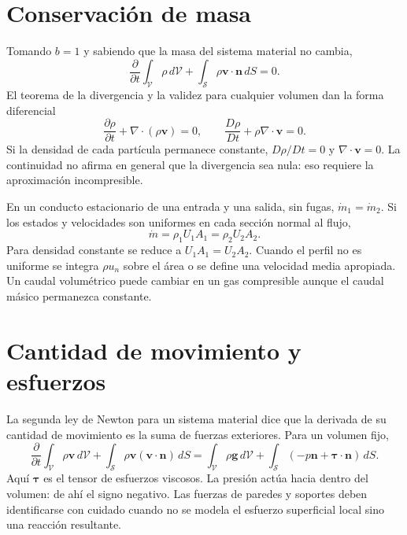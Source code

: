 \section{Conservación de masa}
Tomando $b=1$ y sabiendo que la masa del sistema material no cambia,
\begin{equation}\label{eq:07-masa-int}
 \frac{\partial}{\partial t}\int_{\mathcal V}\rho\,d\mathcal V+
 \int_{\mathcal S}\rho\boldsymbol{v}\cdot\boldsymbol{n}\,dS=0.
\end{equation}
El teorema de la divergencia y la validez para cualquier volumen dan la forma diferencial
\begin{equation}\label{eq:07-masa-dif}
 \frac{\partial\rho}{\partial t}+\nabla\cdot(\rho\boldsymbol{v})=0,
 \qquad \frac{D\rho}{Dt}+\rho\nabla\cdot\boldsymbol{v}=0.
\end{equation}
Si la densidad de cada partícula permanece constante, $D\rho/Dt=0$ y $\nabla\cdot\boldsymbol{v}=0$. La continuidad no afirma en general que la divergencia sea nula: eso requiere la aproximación incompresible.

En un conducto estacionario de una entrada y una salida, sin fugas, $\dot m_1=\dot m_2$. Si los estados y velocidades son uniformes en cada sección normal al flujo,
\begin{equation}
 \dot m=\rho_1U_1A_1=\rho_2U_2A_2.
\end{equation}
Para densidad constante se reduce a $U_1A_1=U_2A_2$. Cuando el perfil no es uniforme se integra $\rho u_n$ sobre el área o se define una velocidad media apropiada. Un caudal volumétrico puede cambiar en un gas compresible aunque el caudal másico permanezca constante.

\section{Cantidad de movimiento y esfuerzos}
La segunda ley de Newton para un sistema material dice que la derivada de su cantidad de movimiento es la suma de fuerzas exteriores. Para un volumen fijo,
\begin{equation}\label{eq:07-momento-int}
 \frac{\partial}{\partial t}\int_{\mathcal V}\rho\boldsymbol{v}\,d\mathcal V+
 \int_{\mathcal S}\rho\boldsymbol{v}(\boldsymbol{v}\cdot\boldsymbol{n})\,dS
 =\int_{\mathcal V}\rho\boldsymbol{g}\,d\mathcal V+
 \int_{\mathcal S}(-p\boldsymbol{n}+\boldsymbol{\tau}\cdot\boldsymbol{n})\,dS.
\end{equation}
Aquí $\boldsymbol{\tau}$ es el tensor de esfuerzos viscosos. La presión actúa hacia dentro del volumen: de ahí el signo negativo. Las fuerzas de paredes y soportes deben identificarse con cuidado cuando no se modela el esfuerzo superficial local sino una reacción resultante.

